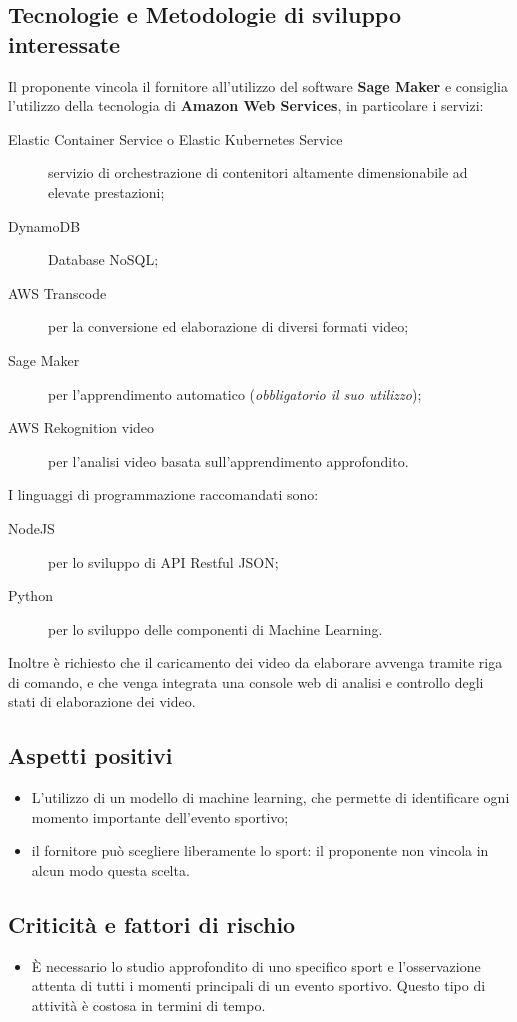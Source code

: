 \documentclass[../studio-di-fattibilita.tex]{subfiles}
\begin{document}
\subsection{Tecnologie e Metodologie di sviluppo interessate}%
\label{subsec:tecnologie_interessate}
Il proponente vincola il fornitore all'utilizzo del software \textbf{Sage Maker} e consiglia l'utilizzo della tecnologia di \textbf{Amazon Web Services}, in particolare i servizi:
\begin{description}
  \item[Elastic Container Service o Elastic Kubernetes Service] servizio di orchestrazione di contenitori altamente dimensionabile ad elevate prestazioni;
  \item[DynamoDB] Database NoSQL;
  \item[AWS Transcode] per la conversione ed elaborazione di diversi formati video;
  \item[Sage Maker] per l'apprendimento automatico (\textit{obbligatorio il suo utilizzo});
  \item[AWS Rekognition video] per l'analisi video basata sull'apprendimento approfondito.
\end{description}
I linguaggi di programmazione raccomandati sono:
\begin{description}
  \item[NodeJS] per lo sviluppo di API Restful JSON;
  \item[Python] per lo sviluppo delle componenti di Machine Learning.
\end{description}
Inoltre è richiesto che il caricamento dei video da elaborare avvenga tramite riga di comando, e che venga integrata una console web di analisi e controllo degli stati di elaborazione dei video.


\subsection{Aspetti positivi}%
\label{subsec:aspetti_positivi}
\begin{itemize}
  \item L'utilizzo di un modello di machine learning, che permette di identificare ogni momento importante dell’evento sportivo;
  \item il fornitore può scegliere liberamente lo sport: il proponente non vincola in alcun modo questa scelta.
\end{itemize}


\subsection{Criticità e fattori di rischio}%
\label{sec:criticita_e_fattori_di_rischio}
\begin{itemize}
  \item È necessario lo studio approfondito di uno specifico sport e l'osservazione attenta di tutti i momenti principali di un evento sportivo. Questo tipo di attività è costosa in termini di tempo.
\end{itemize}
\end{document}
